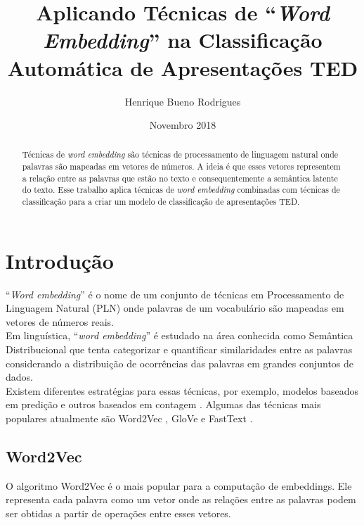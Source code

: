 \documentclass{article}
\title{Aplicando Técnicas de “\textit{Word Embedding}” na Classificação Automática de Apresentações TED}
\author{Henrique Bueno Rodrigues}
\date{Novembro 2018}
\begin{document}
\maketitle


\begin{abstract}
Técnicas de \textit{word embedding} são técnicas de processamento de linguagem natural onde palavras são mapeadas em vetores de números. A ideia é que esses vetores representem a relação entre as palavras que estão no texto e consequentemente a semântica latente do texto. Esse trabalho aplica técnicas de \textit{word embedding} combinadas com técnicas de classificação para a criar um modelo de classificação de apresentações TED.
\end{abstract}


\section{Introdução}

“\textit{Word embedding}” é o nome de um conjunto de técnicas em Processamento de Linguagem Natural (PLN) onde palavras de um vocabulário são mapeadas em vetores de números reais.\\

Em linguística, “\textit{word embedding}” é estudado na área conhecida como Semântica Distribucional que tenta categorizar e quantificar similaridades entre as palavras considerando a distribuição de ocorrências das palavras em grandes conjuntos de dados.\\

Existem diferentes estratégias para essas técnicas, por exemplo, modelos baseados em predição e outros baseados em contagem \citep{baroni2014don}. Algumas das técnicas mais populares atualmente são Word2Vec \citep{mikolov2013efficient}, GloVe \citep{pennington2014glove} e FastText \citep{bojanowski2016enriching}.

\subsection{Word2Vec}

O algoritmo Word2Vec é o mais popular para a computação de embeddings. Ele representa cada palavra como um vetor onde as relações entre as palavras podem ser obtidas a partir de operações entre esses vetores.
\end{document}
